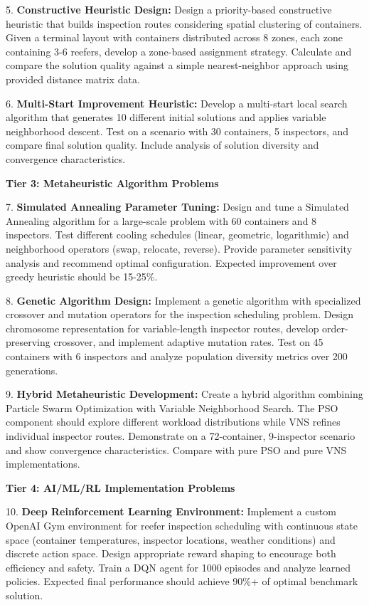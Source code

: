 \documentclass{article}
\begin{document}
5. \textbf{Constructive Heuristic Design:} Design a priority-based constructive heuristic that builds inspection routes considering spatial clustering of containers. Given a terminal layout with containers distributed across 8 zones, each zone containing 3-6 reefers, develop a zone-based assignment strategy. Calculate and compare the solution quality against a simple nearest-neighbor approach using provided distance matrix data.

6. \textbf{Multi-Start Improvement Heuristic:} Develop a multi-start local search algorithm that generates 10 different initial solutions and applies variable neighborhood descent. Test on a scenario with 30 containers, 5 inspectors, and compare final solution quality. Include analysis of solution diversity and convergence characteristics.

\textbf{Tier 3: Metaheuristic Algorithm Problems}

7. \textbf{Simulated Annealing Parameter Tuning:} Design and tune a Simulated Annealing algorithm for a large-scale problem with 60 containers and 8 inspectors. Test different cooling schedules (linear, geometric, logarithmic) and neighborhood operators (swap, relocate, reverse). Provide parameter sensitivity analysis and recommend optimal configuration. Expected improvement over greedy heuristic should be 15-25\%.

8. \textbf{Genetic Algorithm Design:} Implement a genetic algorithm with specialized crossover and mutation operators for the inspection scheduling problem. Design chromosome representation for variable-length inspector routes, develop order-preserving crossover, and implement adaptive mutation rates. Test on 45 containers with 6 inspectors and analyze population diversity metrics over 200 generations.

9. \textbf{Hybrid Metaheuristic Development:} Create a hybrid algorithm combining Particle Swarm Optimization with Variable Neighborhood Search. The PSO component should explore different workload distributions while VNS refines individual inspector routes. Demonstrate on a 72-container, 9-inspector scenario and show convergence characteristics. Compare with pure PSO and pure VNS implementations.

\textbf{Tier 4: AI/ML/RL Implementation Problems}

10. \textbf{Deep Reinforcement Learning Environment:} Implement a custom OpenAI Gym environment for reefer inspection scheduling with continuous state space (container temperatures, inspector locations, weather conditions) and discrete action space. Design appropriate reward shaping to encourage both efficiency and safety. Train a DQN agent for 1000 episodes and analyze learned policies. Expected final performance should achieve 90\%+ of optimal benchmark solution.
\end{document}
